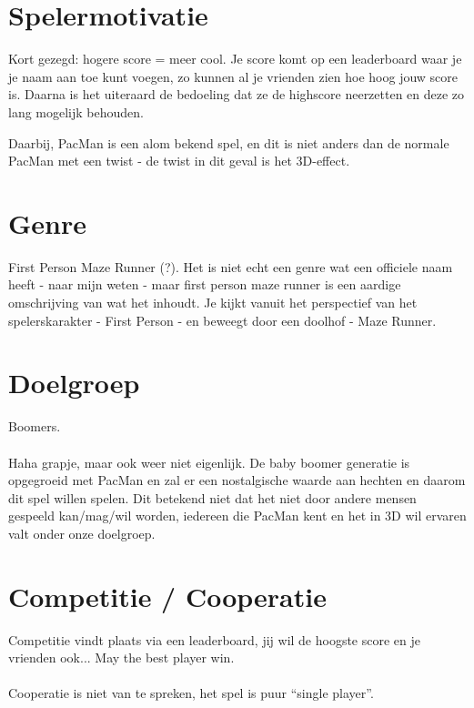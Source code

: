\documentclass{article}
\begin{document}
\section{Spelermotivatie} %
\label{sec:spelermotivatie}
Kort gezegd: hogere score = meer cool. Je score komt op een leaderboard waar je je naam aan toe kunt voegen, zo kunnen al je vrienden zien hoe hoog jouw score is. Daarna is het uiteraard de bedoeling dat ze de highscore neerzetten en deze zo lang mogelijk behouden.

Daarbij, PacMan is een alom bekend spel, en dit is niet anders dan de normale PacMan met een twist - de twist in dit geval is het 3D-effect.

\section{Genre} %
\label{sec:genre}
First Person Maze Runner (?). Het is niet echt een genre wat een officiele naam heeft - naar mijn weten - maar first person maze runner is een aardige omschrijving van wat het inhoudt. Je kijkt vanuit het perspectief van het spelerskarakter - First Person - en beweegt door een doolhof - Maze Runner.

\section{Doelgroep} %
\label{sec:doelgroep}
Boomers.
\\\\
Haha grapje, maar ook weer niet eigenlijk. De baby boomer generatie is opgegroeid met PacMan en zal er een nostalgische waarde aan hechten en daarom dit spel willen spelen. Dit betekend niet dat het niet door andere mensen gespeeld kan/mag/wil worden, iedereen die PacMan kent en het in 3D wil ervaren valt onder onze doelgroep.

\section{Competitie / Cooperatie} %
\label{sec:competitie_cooperatie}
Competitie vindt plaats via een leaderboard, jij wil de hoogste score en je vrienden ook... May the best player win.
\\\\
Cooperatie is niet van te spreken, het spel is puur ``single player''.
\end{document}
